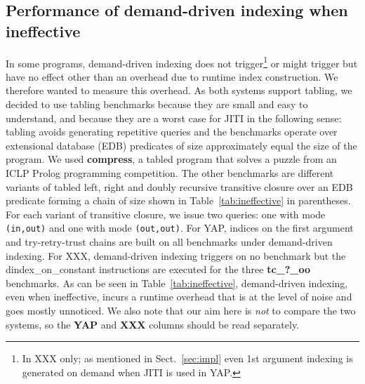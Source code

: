 \documentclass{llncs}
\newcommand{\code}[1]{\texttt{#1}}
\newcommand{\instr}[1]{\textsf{#1}}
\newcommand{\TryRetryTrust}{\mbox{\instr{try-retry-trust}}\xspace}
\newcommand{\jitiONconstant}{\mbox{\instr{dindex\_on\_constant}}\xspace}
\newcommand{\JITI}{demand-driven indexing\xspace}
\newcommand{\bench}[1]{\textbf{\textsf{#1}}}
\newcommand{\compress}{\bench{compress}\xspace}
\begin{document}
\subsection{Performance of \JITI when ineffective} \label{sec:perf:ineffective}
In some programs, \JITI does not trigger\footnote{In XXX only; as
mentioned in Sect.~\ref{sec:impl} even 1st argument indexing is
generated on demand when JITI is used in YAP.} or might trigger but
have no effect other than an overhead due to runtime index
construction. We therefore wanted to measure this overhead.
%
As both systems support tabling, we decided to use tabling benchmarks
because they are small and easy to understand, and because they are a
worst case for JITI in the following sense: tabling avoids generating
repetitive queries and the benchmarks operate over extensional
database (EDB) predicates of size approximately equal the size of the
program. We used \compress, a tabled program that solves a puzzle from
an ICLP Prolog programming competition. The other benchmarks are
different variants of tabled left, right and doubly recursive
transitive closure over an EDB predicate forming a chain of size shown
in Table~\ref{tab:ineffective} in parentheses. For each variant of
transitive closure, we issue two queries: one with mode
\code{(in,out)} and one with mode \code{(out,out)}.
%
For YAP, indices on the first argument and \TryRetryTrust chains are
built on all benchmarks under \JITI.
%
For XXX, \JITI triggers on no benchmark but the \jitiONconstant
instructions are executed for the three \bench{tc\_?\_oo} benchmarks.
%
As can be seen in Table~\ref{tab:ineffective}, \JITI, even when
ineffective, incurs a runtime overhead that is at the level of noise
and goes mostly unnoticed.
%
We also note that our aim here is \emph{not} to compare the two
systems, so the \textbf{YAP} and \textbf{XXX} columns should be read
separately.

\vspace*{-0.5em}
\end{document}
